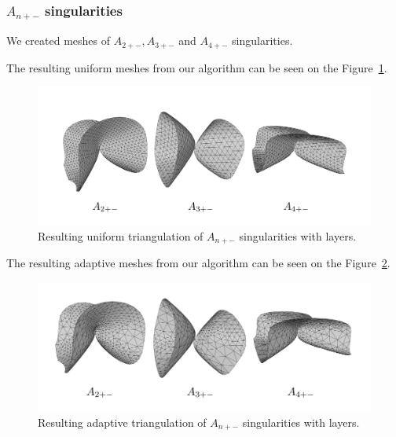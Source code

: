 \clearpage
\subsubsection*{$A_{n+-}$ singularities}
We created meshes of $A_{2+-}, A_{3+-}$ and $A_{4+-}$ singularities.

The resulting uniform meshes from our algorithm can be seen on the 
Figure~\ref{img:63}.
\begin{figure}[h!]
    \centerline{\includegraphics[scale=0.5]{images/img63}}
    \caption[Resulting uniform triangulation of $A_{n+-}$ singularities]
    {Resulting uniform triangulation of $A_{n+-}$ singularities with layers.}
    \label{img:63}
\end{figure}

The resulting adaptive meshes from our algorithm can be seen on the 
Figure~\ref{img:65}.
\begin{figure}[h!]
    \centerline{\includegraphics[scale=0.5]{images/img65}}
    \caption[Resulting adaptive triangulation of $A_{n+-}$ singularities]
    {Resulting adaptive triangulation of $A_{n+-}$ singularities with layers.}
    \label{img:65}
\end{figure}


